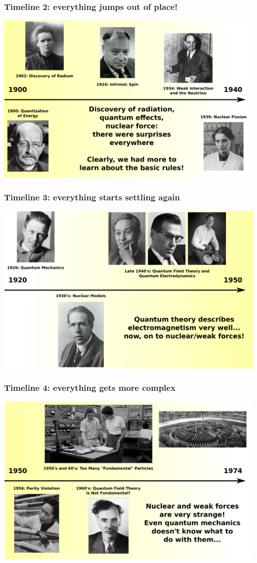 \documentclass[compress]{beamer}
\begin{document}
\begin{frame}
\frametitle{Timeline 2: everything jumps out of place!}
\includegraphics[width=\linewidth]{timeline2.pdf}
\end{frame}

\begin{frame}
\frametitle{Timeline 3: everything starts settling again}
\includegraphics[width=\linewidth]{timeline3.pdf}
\end{frame}

\begin{frame}
\frametitle{Timeline 4: everything gets more complex}
\includegraphics[width=\linewidth]{timeline4.pdf}
\end{frame}
\end{document}
